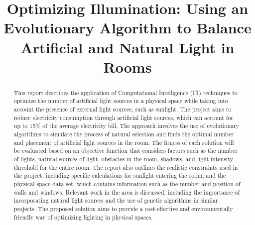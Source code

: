 \documentclass[conference]{IEEEtran}
\begin{document}
\title{Optimizing Illumination: Using an Evolutionary Algorithm to Balance Artificial and Natural Light in Rooms
}

\author{
    \and
    \and
    \and
}

\maketitle

\begin{abstract}
    This report describes the application of Computational Intelligence (CI) techniques to optimize the number of artificial light sources in a physical space while taking into account the presence of external light sources, such as sunlight. The project aims to reduce electricity consumption through artificial light sources, which can account for up to 15\% of the average electricity bill. The approach involves the use of evolutionary algorithms to simulate the process of natural selection and finds the optimal number and placement of artificial light sources in the room. The fitness of each solution will be evaluated based on an objective function that considers factors such as the number of lights, natural sources of light, obstacles in the room, shadows, and light intensity threshold for the entire room. The report also outlines the realistic constraints used in the project, including specific calculations for sunlight entering the room, and the physical space data set, which contains information such as the number and position of walls and windows. Relevant work in the area is discussed, including the importance of incorporating natural light sources and the use of genetic algorithms in similar projects. The proposed solution aims to provide a cost-effective and environmentally friendly way of optimizing lighting in physical spaces.\\
\end{abstract}
\end{document}
